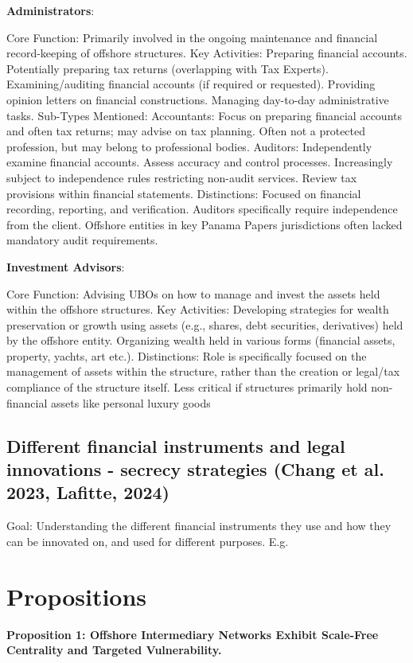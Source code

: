\textbf{Administrators}:

Core Function: Primarily involved in the ongoing maintenance and financial record-keeping of offshore structures.
Key Activities: Preparing financial accounts. Potentially preparing tax returns (overlapping with Tax Experts). Examining/auditing financial accounts (if required or requested). Providing opinion letters on financial constructions. Managing day-to-day administrative tasks.
Sub-Types Mentioned:
Accountants: Focus on preparing financial accounts and often tax returns; may advise on tax planning. Often not a protected profession, but may belong to professional bodies.
Auditors: Independently examine financial accounts. Assess accuracy and control processes. Increasingly subject to independence rules restricting non-audit services. Review tax provisions within financial statements.
Distinctions: Focused on financial recording, reporting, and verification. Auditors specifically require independence from the client. Offshore entities in key Panama Papers jurisdictions often lacked mandatory audit requirements.

\textbf{Investment Advisors}:

Core Function: Advising UBOs on how to manage and invest the assets held within the offshore structures.
Key Activities: Developing strategies for wealth preservation or growth using assets (e.g., shares, debt securities, derivatives) held by the offshore entity. Organizing wealth held in various forms (financial assets, property, yachts, art etc.).
Distinctions: Role is specifically focused on the management of assets within the structure, rather than the creation or legal/tax compliance of the structure itself. Less critical if structures primarily hold non-financial assets like personal luxury goods

\subsection{Different financial instruments and legal innovations - secrecy strategies (Chang et al. 2023, Lafitte, 2024)}
\label{subsec:2_1_5}
Goal: Understanding the different financial instruments they use and how they can be innovated on, and used for different purposes. E.g.

\section{Propositions}
\label{sec:2_2}

\textbf{Proposition 1: Offshore Intermediary Networks Exhibit Scale-Free Centrality and Targeted Vulnerability.}

